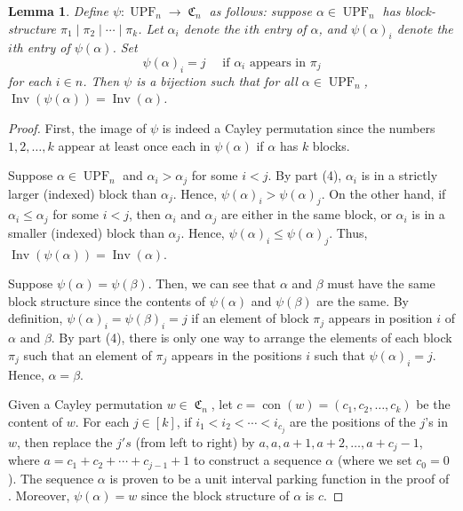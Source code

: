 \documentclass{amsart}
\DeclareMathOperator{\Inv}{Inv}
\DeclareMathOperator{\UPF}{UPF} %
\DeclareMathOperator{\con}{con}
\DeclareMathOperator{\C}{\mathfrak{C}}
\newtheorem{lemma}[theorem]{Lemma}
\theoremstyle{definition}
\begin{document}
\begin{lemma}\label{thm:bijection upf and cayley}
    Define $\psi:\UPF_n\to \C_n$ as follows: suppose $\alpha\in \UPF_n$ has block-structure $\pi_1\mid\pi_2\mid\cdots\mid\pi_k$. 
    Let $\alpha_i$ denote the $i$th entry of $\alpha$, and $\psi(\alpha)_i$ denote the $i$th entry of $\psi(\alpha)$.
    Set
    \[\psi(\alpha)_i=j\quad \text{ if $\alpha_i$ appears in $\pi_j$}\]
    for each $i\in n$. Then $\psi$ is a bijection such that for all $\alpha\in \UPF_n$, $\Inv(\psi(\alpha))=\Inv(\alpha)$.
\end{lemma}
\begin{proof}
    First, the image of $\psi$ is indeed a Cayley permutation since the numbers $1,2,\dots,k$ appear at least once each in $\psi(\alpha)$ if $\alpha$ has $k$ blocks.

    Suppose $\alpha\in \UPF_n$ and $\alpha_i>\alpha_j$ for some $i<j$. By  part (4),  $\alpha_i$ is in a strictly larger (indexed) block than $\alpha_j$. Hence, $\psi(\alpha)_i>\psi(\alpha)_j$. On the other hand, if $\alpha_i\leq \alpha_j$ for some $i<j$, then $\alpha_i$ and $\alpha_j$ are either in the same block, or $\alpha_i$ is in a smaller (indexed) block than $\alpha_j$. Hence, $\psi(\alpha)_i\leq \psi(\alpha)_j$. Thus, $\Inv(\psi(\alpha))=\Inv(\alpha)$. 

    Suppose $\psi(\alpha)=\psi(\beta)$. Then, we can see that $\alpha$ and $\beta$ must have the same block structure since the contents of $\psi(\alpha)$ and $\psi(\beta)$ are the same. By definition, $\psi(\alpha)_i=\psi(\beta)_i=j$ if an element of block $\pi_j$ appears in position $i$ of $\alpha$ and $\beta$. By  part (4), there is only one way to arrange the elements of each block $\pi_j$ such that an element of $\pi_j$ appears in the positions $i$ such that $\psi(\alpha)_i=j$. Hence, $\alpha=\beta$. 

    Given a Cayley permutation $w\in \C_n$, let $c=\con(w)=(c_1,c_2,\dots,c_k)$ be the content of $w$. 
    For each $j\in [k]$, if $i_1<i_2<\cdots<i_{c_j}$ are the positions of the $j$'s in $w$, then replace the $j's$ (from left to right) by $a,a,a+1,a+2,\dots,a+c_j-1$, where $a=c_1+c_2+\cdots+c_{j-1}+1$ to construct a sequence $\alpha$ (where we set $c_0=0$). 
    The sequence $\alpha$ is proven to be a unit interval parking function in the proof of \cite[Theorem 2.5]{bradt2024unit}. 
    Moreover, $\psi(\alpha)=w$ since the block structure of $\alpha$ is $c$.
\end{proof}
\end{document}
